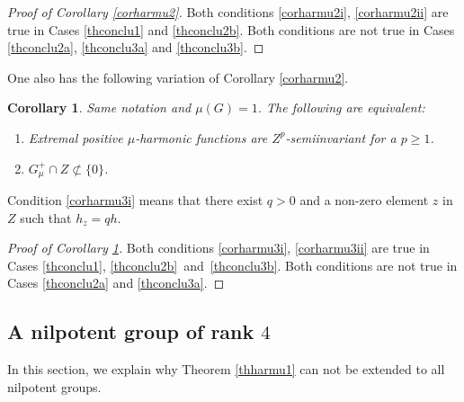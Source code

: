 \documentclass[11pt]{article}
\numberwithin{equation}{section}
\newenvironment{enumeratei}
{\bgroup\def\theenumi{\roman{enumi}}\def\theenumii{\arabic{enumii}}\begin{enumerate}}
{\end{enumerate}\egroup}
\newtheorem{Cor}[Thm]{Corollary}
\theoremstyle{definition}
\let\bq\relax
\let\eq\relax
\begin{document}
\begin{proof}[Proof of Corollary \ref{corharmu2}]
Both conditions \eqref{corharmu2i}, \eqref{corharmu2ii}
are true in Cases \eqref{thconclu1} and \eqref{thconclu2b}.
Both conditions
are not true in Cases \eqref{thconclu2a}, \eqref{thconclu3a} and \eqref{thconclu3b}.
\end{proof}

One also has the following variation of Corollary \ref{corharmu2}.

\begin{Cor}
\label{corharmu3}
Same notation and $\mu(G)=1$.
The following are equivalent:
\begin{enumeratei}
\item\label{corharmu3i}
Extremal positive $\mu$-harmonic functions are $Z^{p}$-semiinvariant
for a $p\geq 1$.
\item\label{corharmu3ii}
$G_\mu^+\cap Z\not\subset\{0\}$.
\end{enumeratei}
\end{Cor}

Condition \eqref{corharmu3i} means that there exist $q>0$ and a non-zero element $z$ in $Z$
such that $h_z=qh$.

\begin{proof}[Proof of Corollary \ref{corharmu3}]
Both conditions \eqref{corharmu3i}, \eqref{corharmu3ii}
are true in Cases \eqref{thconclu1}, \eqref{thconclu2b}~and~\eqref{thconclu3b}.
Both conditions
are not true in Cases \eqref{thconclu2a} and \eqref{thconclu3a}.
\end{proof}

\subsection{A nilpotent group of rank $4$}
\label{secrankfour}

\bq
In this section, we explain why Theorem \ref{thharmu1}
can not be extended to all nilpotent groups.
\eq
\end{document}

